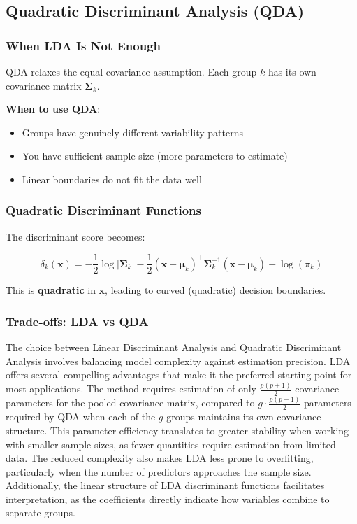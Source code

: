 \documentclass[
]{article}
\begin{document}
\subsection{Quadratic Discriminant Analysis (QDA)}

\subsubsection{When LDA Is Not Enough}

QDA relaxes the equal covariance assumption. Each group \(k\) has its
own covariance matrix \(\mathbf{\Sigma}_{k}\).

\textbf{When to use QDA}:

\begin{itemize}
\item
  Groups have genuinely different variability patterns
\item
  You have sufficient sample size (more parameters to estimate)
\item
  Linear boundaries do not fit the data well
\end{itemize}

\subsubsection{Quadratic Discriminant Functions}

The discriminant score becomes:

\[\delta_{k}\left( \mathbf{x} \right) = - \frac{1}{2}\log|\mathbf{\Sigma}_{k}| - \frac{1}{2}\left( \mathbf{x} - \mathbf{\mu}_{k} \right)^{\top}\mathbf{\Sigma}_{k}^{- 1}\left( \mathbf{x} - \mathbf{\mu}_{k} \right) + \log(\pi_{k})\]

This is \textbf{quadratic} in \(\mathbf{x}\), leading to curved
(quadratic) decision boundaries.

\subsubsection{Trade-offs: LDA vs QDA}

The choice between Linear Discriminant Analysis and Quadratic
Discriminant Analysis involves balancing model complexity against
estimation precision. LDA offers several compelling advantages that make
it the preferred starting point for most applications. The method
requires estimation of only \(\frac{p(p + 1)}{2}\) covariance parameters
for the pooled covariance matrix, compared to
\(g \cdot \frac{p(p + 1)}{2}\) parameters required by QDA when each of
the \(g\) groups maintains its own covariance structure. This parameter
efficiency translates to greater stability when working with smaller
sample sizes, as fewer quantities require estimation from limited data.
The reduced complexity also makes LDA less prone to overfitting,
particularly when the number of predictors approaches the sample size.
Additionally, the linear structure of LDA discriminant functions
facilitates interpretation, as the coefficients directly indicate how
variables combine to separate groups.
\end{document}
